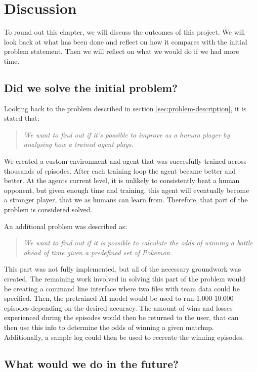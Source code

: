 \section{Discussion}
\label{sec:discussion}

To round out this chapter, we will discuss the outcomes of this project. We will look back at what has been done
and reflect on how it compares with the initial problem statement. Then we will reflect on what we would do if we had more time.

\subsection{Did we solve the initial problem?}
Looking back to the problem described in section \ref{sec:problem-description}, it is stated that: 
\begin{quote}
  \itshape{We want to find out if it's possible to improve as a human player by analysing how a trained agent plays.}
\end{quote}
We created a custom environment and agent that was succesfully trained across thousands of episodes. After each training 
loop the agent became better and better. At the agents current level, it is unlikely to consistently beat a human opponent,
but given enough time and training, this agent will eventually become a stronger player, that we as humans can learn from.
Therefore, that part of the problem is considered solved.

An additional problem was described as:
\begin{quote}
  \itshape{We want to find out if it is possible to calculate the odds of winning a battle ahead of time given a predefined set of Pokemon.}
\end{quote}
This part was not fully implemented, but all of the necessary groundwork was created. The remaining work involved in solving
this part of the problem would be creating a command line interface where two files with team data could be specified. 
Then, the pretrained AI model would be used to run 1.000-10.000 episodes depending on the desired accuracy. The amount of wins
and losses experienced during the episodes would then be returned to the user, that can then use this info to determine 
the odds of winning a given matchup. Additionally, a sample log could then be used to recreate the winning episodes.

\subsection{What would we do in the future?}
